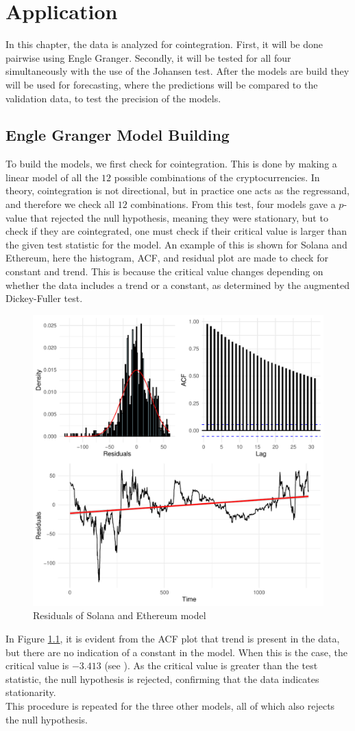 \chapter{Application}
In this chapter, the data is analyzed for cointegration. First, it will be done pairwise using Engle Granger. Secondly, it will be tested for all four simultaneously with the use of the Johansen test. After the models are build they will be used for forecasting, where the predictions will be compared to the validation data, to test the precision of the models.


\section{Engle Granger Model Building}
To build the models, we first check for cointegration. This is done by making a linear model of all the $12$ possible combinations of the cryptocurrencies. In theory, cointegration is not directional, but in practice one acts as the regressand, and therefore we check all $12$ combinations. From this test, four models gave a $p$-value that rejected the null hypothesis, meaning they were stationary, but to check if they are cointegrated, one must check if their critical value is larger than the given test statistic for the model. An example of this is shown for Solana and Ethereum, here the histogram, ACF, and residual plot are made to check for constant and trend. This is because the critical value changes depending on whether the data includes a trend or a constant, as determined by the augmented Dickey-Fuller test. 
\begin{figure}[h]
    \centering
    \includegraphics[width=0.4\linewidth]{1.Projekt_kode/Billeder/plot_grid_ADF_Solana-Ethereum.pdf}
    \caption{Residuals of Solana and Ethereum model}
    \label{fig:ADF_HIST_GRAPH_SOLANA_ETHEREUM}
\end{figure}

\noindent In Figure \ref{fig:ADF_HIST_GRAPH_SOLANA_ETHEREUM}, it is evident from the ACF plot that trend is present in the data, but there are no indication of a constant in the model. When this is the case, the critical value is $-3.413$ (see \cite{ADf_crit_val}). As the critical value is greater than the test statistic, the null hypothesis is rejected, confirming that the data indicates stationarity. \\
\noindent This procedure is repeated for the three other models, all of which also rejects the null hypothesis. 


